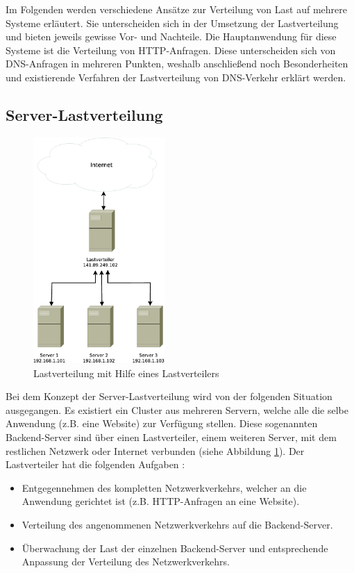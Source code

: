 \documentclass[a4paper, 12pt, BCOR10mm, DIV12, toc=bibliography, toc=listof, german]{scrbook}
\begin{document}
		Im Folgenden werden verschiedene Ansätze zur Verteilung von Last auf mehrere Systeme erläutert.
		Sie unterscheiden sich in der Umsetzung der Lastverteilung und bieten jeweils gewisse Vor- und
		Nachteile. Die Hauptanwendung für diese Systeme ist die Verteilung von HTTP-Anfragen.
		Diese unterscheiden sich von DNS-Anfragen in mehreren Punkten, weshalb anschließend noch
		Besonderheiten und existierende Verfahren der Lastverteilung von DNS-Verkehr erklärt werden.
	
			\subsection{Server-Lastverteilung} %
			\label{sub:Server-Lastverteilung}
			
			\begin{figure}
				\centering
				\includegraphics[width=5cm]{images/loadbalancer}
				\caption{Lastverteilung mit Hilfe eines Lastverteilers}
				\label{fig:loadbalancer}
			\end{figure}

			Bei dem Konzept der Server-Lastverteilung wird von der folgenden Situation ausgegangen.  Es
			existiert ein Cluster aus mehreren Servern, welche alle die selbe Anwendung (z.B. eine
			Website) zur Verfügung stellen. Diese sogenannten Backend-Server sind über einen
			Lastverteiler, einem weiteren Server, mit dem restlichen Netzwerk oder Internet verbunden
			(siehe Abbildung \ref{fig:loadbalancer}). Der Lastverteiler hat die folgenden Aufgaben
			\cite{bourke2001}:

			\begin{itemize}
				\item Entgegennehmen des kompletten Netzwerkverkehrs, welcher an die Anwendung gerichtet ist
					(z.B. HTTP-Anfragen an eine Website).
				\item Verteilung des angenommenen Netzwerkverkehrs auf die Backend-Server.
				\item Überwachung der Last der einzelnen Backend-Server und entsprechende Anpassung der
					Verteilung des Netzwerkverkehrs.
			\end{itemize}
\end{document}
